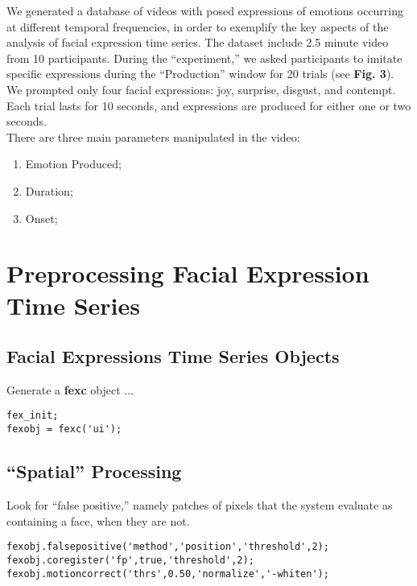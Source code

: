 \documentclass[11pt, oneside]{article}
\begin{document}
\noindent We generated a database of videos with posed expressions of emotions occurring at different temporal frequencies, in order to exemplify the key aspects of the analysis of facial expression time series. The dataset include 2.5 minute video from 10 participants. During the ``experiment,'' we asked participants to imitate specific expressions during the ``Production'' window for 20 trials (see \textbf{Fig. 3}). We prompted only four facial expressions: joy, surprise, disgust, and contempt. Each trial lasts for 10 seconds, and expressions are produced for either one or two seconds.\\

\noindent There are three main parameters manipulated in the video:\\

\begin{enumerate}
\item Emotion Produced;
\item Duration;
\item Onset;
\end{enumerate}


\section{Preprocessing Facial Expression Time Series}

\subsection{Facial Expressions Time Series Objects}

\noindent Generate a \textbf{fexc} object ... 

\begin{lstlisting}
fex_init;
fexobj = fexc('ui');
\end{lstlisting}

\subsection{``Spatial'' Processing}

\noindent Look for ``false positive,'' namely patches of pixels that the system evaluate as containing a face, when they are not.

\begin{lstlisting}
fexobj.falsepositive('method','position','threshold',2);
fexobj.coregister('fp',true,'threshold',2);
fexobj.motioncorrect('thrs',0.50,'normalize','-whiten');
\end{lstlisting}
\end{document}

